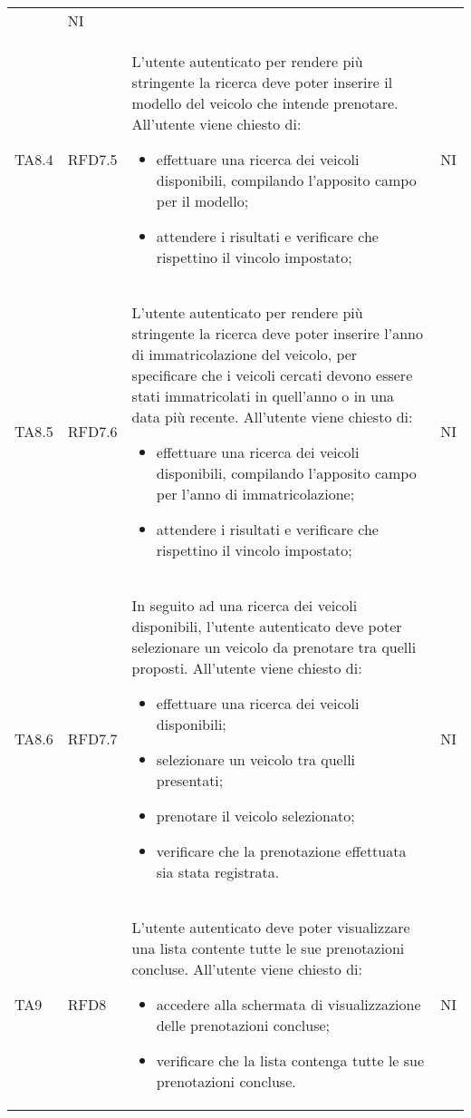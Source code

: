 \begin{longtable}{ >{\centering}p{} >{\centering}p{} >{\centering}p{}
			>{\centering}p{}}
\begin{itemize}
		 \end{itemize}	&	NI	\tabularnewline
		  TA8.4	& RFD7.5 &	L'utente autenticato per rendere più stringente la ricerca deve poter inserire il modello del veicolo che intende prenotare. All'utente viene chiesto di:
		 \begin{itemize}
		 	\item effettuare una ricerca dei veicoli disponibili, compilando l'apposito campo per il modello;
		 	\item attendere i risultati e verificare che rispettino il vincolo impostato;
		 \end{itemize}	&	NI	\tabularnewline
		  TA8.5	& RFD7.6 &	L'utente autenticato per rendere più stringente la ricerca deve poter inserire l'anno di immatricolazione del veicolo, per specificare che i veicoli cercati devono essere stati immatricolati in quell'anno o in una data più recente. All'utente viene chiesto di:
		 \begin{itemize}
		 	\item effettuare una ricerca dei veicoli disponibili, compilando l'apposito campo per l'anno di immatricolazione;
		 	\item attendere i risultati e verificare che rispettino il vincolo impostato;
		 \end{itemize}	&	NI	\tabularnewline
		 TA8.6 & RFD7.7 &	In seguito ad una ricerca dei veicoli disponibili, l'utente autenticato deve poter selezionare un veicolo da prenotare tra quelli proposti. All'utente viene chiesto di:
		 \begin{itemize}
		 	\item effettuare una ricerca dei veicoli disponibili;
		 	\item selezionare un veicolo tra quelli presentati;
		 	\item prenotare il veicolo selezionato;
		 	\item verificare che la prenotazione effettuata sia stata registrata.
		 \end{itemize}	&	NI	\tabularnewline
		 
		 TA9 &	RFD8 & L'utente autenticato deve poter visualizzare una lista contente tutte le sue prenotazioni concluse. All'utente viene chiesto di:
		 \begin{itemize}
		 	\item accedere alla schermata di visualizzazione delle prenotazioni concluse;
		 	\item verificare che la lista contenga tutte le sue prenotazioni concluse.
		 \end{itemize}	&	NI	\tabularnewline
		 

\end{longtable}
